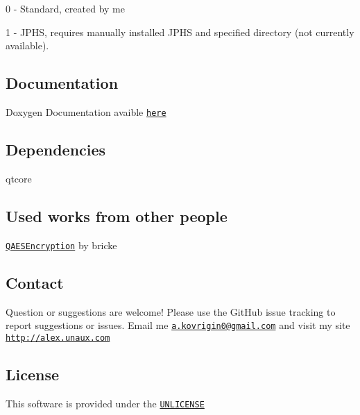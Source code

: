 \begin{DoxyItemize}
\item 0 -\/ Standard, created by me
\item 1 -\/ J\+P\+HS, requires manually installed J\+P\+HS and specified directory (not currently available).
\end{DoxyItemize}

\subsection*{Documentation}

Doxygen Documentation avaible \href{https://waleko.github.io/PictureCrypt}{\tt here}

\subsection*{Dependencies}


\begin{DoxyItemize}
\item qtcore
\end{DoxyItemize}

\subsection*{Used works from other people}


\begin{DoxyItemize}
\item \href{https://github.com/bricke/Qt-AES}{\tt Q\+A\+E\+S\+Encryption} by bricke
\end{DoxyItemize}

\subsection*{Contact}

Question or suggestions are welcome! Please use the Git\+Hub issue tracking to report suggestions or issues. Email me \href{mailto:a.kovrigin0@gmail.com}{\tt a.\+kovrigin0@gmail.\+com} and visit my site \href{http://alex.unaux.com}{\tt http\+://alex.\+unaux.\+com}

\subsection*{License}

This software is provided under the \href{http://unlicense.org/}{\tt U\+N\+L\+I\+C\+E\+N\+SE} 